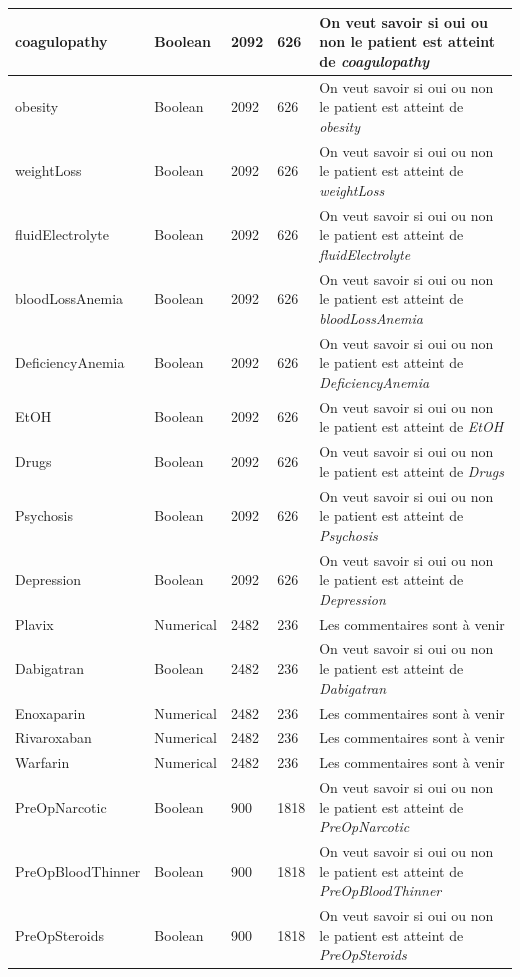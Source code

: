 \documentclass[12pt, french]{report}
\begin{document}
\begin{longtable}{ | p{} | p{} | p{}  | p{} | p{} |  }
coagulopathy & Boolean & 2092 & 626& On veut savoir si oui ou non le patient est atteint de \textit{coagulopathy} \\ \hline 
obesity & Boolean & 2092 & 626& On veut savoir si oui ou non le patient est atteint de \textit{obesity} \\ \hline 
weightLoss & Boolean & 2092 & 626& On veut savoir si oui ou non le patient est atteint de \textit{weightLoss} \\ \hline 
fluidElectrolyte & Boolean & 2092 & 626& On veut savoir si oui ou non le patient est atteint de \textit{fluidElectrolyte} \\ \hline 
bloodLossAnemia & Boolean & 2092 & 626& On veut savoir si oui ou non le patient est atteint de \textit{bloodLossAnemia} \\ \hline 
DeficiencyAnemia & Boolean & 2092 & 626& On veut savoir si oui ou non le patient est atteint de \textit{DeficiencyAnemia} \\ \hline 
EtOH & Boolean & 2092 & 626& On veut savoir si oui ou non le patient est atteint de \textit{EtOH} \\ \hline 
Drugs & Boolean & 2092 & 626& On veut savoir si oui ou non le patient est atteint de \textit{Drugs} \\ \hline 
Psychosis & Boolean & 2092 & 626& On veut savoir si oui ou non le patient est atteint de \textit{Psychosis} \\ \hline 
Depression & Boolean & 2092 & 626& On veut savoir si oui ou non le patient est atteint de \textit{Depression} \\ \hline 
Plavix & Numerical & 2482 & 236 & Les commentaires sont à venir \\ \hline 
Dabigatran & Boolean & 2482 & 236& On veut savoir si oui ou non le patient est atteint de \textit{Dabigatran} \\ \hline 
Enoxaparin & Numerical & 2482 & 236 & Les commentaires sont à venir \\ \hline 
Rivaroxaban & Numerical & 2482 & 236 & Les commentaires sont à venir \\ \hline 
Warfarin & Numerical & 2482 & 236 & Les commentaires sont à venir \\ \hline 
PreOpNarcotic & Boolean & 900 & 1818& On veut savoir si oui ou non le patient est atteint de \textit{PreOpNarcotic} \\ \hline 
PreOpBloodThinner & Boolean & 900 & 1818& On veut savoir si oui ou non le patient est atteint de \textit{PreOpBloodThinner} \\ \hline 
PreOpSteroids & Boolean & 900 & 1818& On veut savoir si oui ou non le patient est atteint de \textit{PreOpSteroids} \\ \hline 

\end{longtable}
\end{document}
